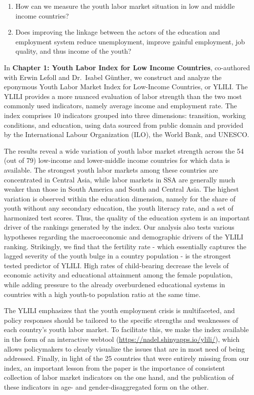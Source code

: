\documentclass[
  a4paper, twoside, 12pt]{book}
\providecommand{\tightlist}{%
  \setlength{\itemsep}{0pt}\setlength{\parskip}{0pt}}
\begin{document}
\begin{enumerate}
\def\labelenumi{\arabic{enumi}.}
\tightlist
\item
  How can we measure the youth labor market situation in low and middle income countries?
\item
  Does improving the linkage between the actors of the education and employment system reduce unemployment, improve gainful employment, job quality, and thus income of the youth?
\end{enumerate}

\noindent In \textbf{Chapter 1: Youth Labor Index for Low Income Countries}, co-authored with Erwin Lefoll and Dr.~Isabel Günther, we construct and analyze the eponymous Youth Labor Market Index for Low-Income Countries, or YLILI. The YLILI provides a more nuanced evaluation of labor strength than the two most commonly used indicators, namely average income and employment rate. The index comprises 10 indicators grouped into three dimensions: transition, working conditions, and education, using data sourced from public domain and provided by the International Labour Organization (ILO), the World Bank, and UNESCO.

The results reveal a wide variation of youth labor market strength across the 54 (out of 79) low-income and lower-middle income countries for which data is available. The strongest youth labor markets among these countries are concentrated in Central Asia, while labor markets in SSA are generally much weaker than those in South America and South and Central Asia. The highest variation is observed within the education dimension, namely for the share of youth without any secondary education, the youth literacy rate, and a set of harmonized test scores. Thus, the quality of the education system is an important driver of the rankings generated by the index. Our analysis also tests various hypotheses regarding the macroeconomic and demographic drivers of the YLILI ranking. Strikingly, we find that the fertility rate - which essentially captures the lagged severity of the youth bulge in a country population - is the strongest tested predictor of YLILI. High rates of child-bearing decrease the levels of economic activity and educational attainment among the female population, while adding pressure to the already overburdened educational systems in countries with a high youth-to population ratio at the same time.

The YLILI emphasizes that the youth employment crisis is multifaceted, and policy responses should be tailored to the specific strengths and weaknesses of each country's youth labor market. To facilitate this, we make the index available in the form of an interactive webtool (\href{https://nadel.shinyapps.io/ylili}{https://nadel.shinyapps.io/ylili/}), which allows policymakers to clearly visualize the issues that are in most need of being addressed. Finally, in light of the 25 countries that were entirely missing from our index, an important lesson from the paper is the importance of consistent collection of labor market indicators on the one hand, and the publication of these indicators in age- and gender-disaggregated form on the other.
\end{document}
